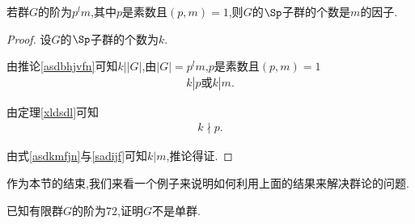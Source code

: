 \begin{corollary}\label{asuidgbuj}
    若群$G$的阶为$p^lm$,其中$p$是素数且$(p,m)=1$,则$G$的$\Sp$子群的个数是$m$的因子.
\end{corollary}
\begin{proof}
    设$G$的$\Sp$子群的个数为$k$.

    由推论\ref{asdbhjvfn}可知$k\Big||G|$,由$|G|=p^lm$,$p$是素数且$(p,m)=1$\begin{align}\label{asdkmfjn}
        k|p\text{或}k|m.
    \end{align}

    由定理\ref{xldsdl}可知\begin{align}\label{sadijf}
        k\nmid p.
    \end{align}

    由式\eqref{asdkmfjn}与\eqref{sadijf}可知$k|m$,推论得证.
\end{proof}
作为本节的结束,我们来看一个例子来说明如何利用上面的结果来解决群论的问题.
\begin{example}
    已知有限群$G$的阶为$72$,证明$G$不是单群.
\end{example}

